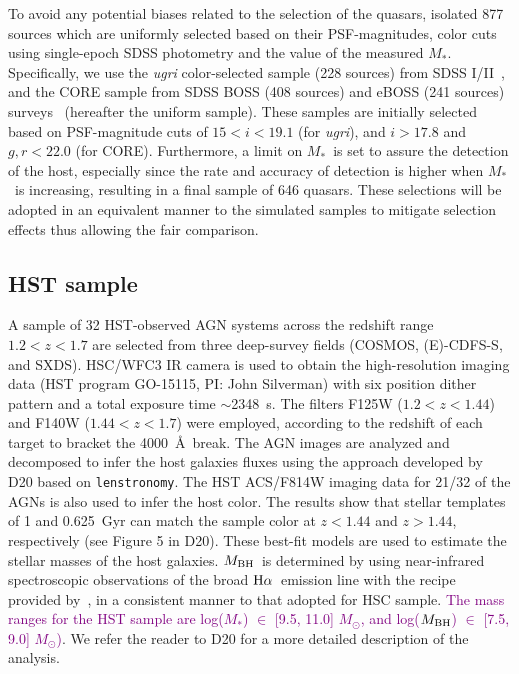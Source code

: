 \documentclass[twocolumn]{aastex631}
\newcommand{\red}[1]{\textcolor{purple}{#1}}
\def\smass{{$M_*$}}
\def\halpha{${\rm H}\alpha$}
\def\mbh{$M_{\rm BH}$}
\begin{document}
To avoid any potential biases related to the selection of the quasars, \citet{Li2021b} isolated 877 sources which are uniformly selected based on their PSF-magnitudes, color cuts using single-epoch SDSS photometry and the value of the measured \smass. Specifically, we use the {\it ugri} color-selected sample (228 sources) from SDSS I/II~\citep{Richards2002}, and the CORE sample from SDSS BOSS (408 sources) and eBOSS (241 sources) surveys~\citep{Ross2013, Myers2015} (hereafter the uniform sample). These samples are initially selected based on PSF-magnitude cuts of $15 < i < 19.1$ (for {\it ugri}), and $i > 17.8$ and $g, r < 22.0$ (for CORE). Furthermore, a limit on \smass\ is set to assure the detection of the host, especially since the rate and accuracy of detection is higher when \smass\ is increasing, resulting in a final sample of 646 quasars. These selections will be adopted in an equivalent manner to the simulated samples to mitigate selection effects thus allowing the fair comparison.

\subsection{HST sample}

A sample of 32 HST-observed AGN systems across the redshift range $1.2<z<1.7$ are selected from three deep-survey fields (COSMOS, (E)-CDFS-S, and SXDS). HSC/WFC3 IR camera is used to obtain the high-resolution imaging data (HST program GO-15115, PI: John Silverman) with six position dither pattern and a total exposure time $\sim$2348~s. The filters F125W ($1.2<z<1.44$) and F140W ($1.44<z<1.7$) were employed, according to the redshift of each target to bracket the 4000~\AA~break.  The AGN images are analyzed and decomposed to infer the host galaxies fluxes using the approach developed by D20 based on {\tt lenstronomy}. The HST ACS/F814W imaging data for 21/32 of the AGNs is also used to infer the host color. The results show that stellar templates of 1 and 0.625~Gyr can match the sample color at $z<1.44$ and $z>1.44$, respectively (see Figure 5 in D20). These best-fit models are used to estimate the stellar masses of the host galaxies. \mbh\ is determined by \citet{Schulze2018} using near-infrared spectroscopic observations of the broad \halpha\ emission line with the recipe provided by~\citet{Vestergaard2006}, in a consistent manner to that adopted for HSC sample. \red{The mass ranges for the HST sample are log(\smass) $\in$ [9.5, 11.0] $M_{\odot}$, and log(\mbh) $\in$  [7.5, 9.0] $M_{\odot}$)}.
 We refer the reader to D20 for a more detailed description of the analysis. 
\end{document}
